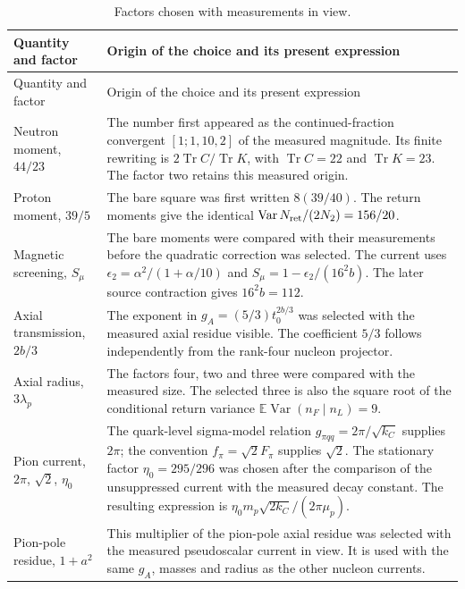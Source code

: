 \documentclass[aps,prx,onecolumn,10pt,notitlepage,nofootinbib,longbibliography]{revtex4-2}
\numberwithin{equation}{section}
\numberwithin{table}{section}
\newcommand{\EE}{\mathbb E}
\newcommand{\Tr}{\operatorname{Tr}}
\newcommand{\Var}{\operatorname{Var}}
\begin{document}
\begingroup\small
\setlength{\tabcolsep}{4pt}\renewcommand{\arraystretch}{1.12}
\begin{longtable}{@{}>{\raggedright\arraybackslash}p{}>{\raggedright\arraybackslash}p{}@{}}
\caption{Factors chosen with measurements in view.}\label{tab:measuredchoices}\\
\toprule Quantity and factor&Origin of the choice and its present expression\\\midrule
\endfirsthead
\toprule Quantity and factor&Origin of the choice and its present expression\\\midrule
\endhead\bottomrule\endfoot
Neutron moment, $44/23$&The number first appeared as the continued-fraction convergent $[1;1,10,2]$ of the measured magnitude. Its finite rewriting is $2\Tr C/\Tr K$, with $\Tr C=22$ and $\Tr K=23$. The factor two retains this measured origin.\\[5pt]
Proton moment, $39/5$&The bare square was first written $8(39/40)$. The return moments give the identical $\Var N_{\rm ret}/(2N_2)=156/20$.\\[5pt]
Magnetic screening, $S_\mu$&The bare moments were compared with their measurements before the quadratic correction was selected. The current uses $\epsilon_2=\alpha^2/(1+\alpha/10)$ and $S_\mu=1-\epsilon_2/(16^2b)$. The later source contraction gives $16^2b=112$.\\[5pt]
Axial transmission, $2b/3$&The exponent in $g_A=(5/3)t_0^{2b/3}$ was selected with the measured axial residue visible. The coefficient $5/3$ follows independently from the rank-four nucleon projector.\\[5pt]
Axial radius, $3\lambda_p$&The factors four, two and three were compared with the measured size. The selected three is also the square root of the conditional return variance $\EE\Var(n_F\mid n_L)=9$.\\[5pt]
Pion current, $2\pi$, $\sqrt2$, $\eta_0$&The quark-level sigma-model relation $g_{\pi qq}=2\pi/\sqrt{k_C}$ supplies $2\pi$; the convention $f_\pi=\sqrt2F_\pi$ supplies $\sqrt2$. The stationary factor $\eta_0=295/296$ was chosen after the comparison of the unsuppressed current with the measured decay constant. The resulting expression is $\eta_0 m_p\sqrt{2k_C}/(2\pi\mu_p)$.\\[5pt]
Pion-pole residue, $1+a^2$&This multiplier of the pion-pole axial residue was selected with the measured pseudoscalar current in view. It is used with the same $g_A$, masses and radius as the other nucleon currents.\\[5pt]

\end{longtable}
\end{document}
